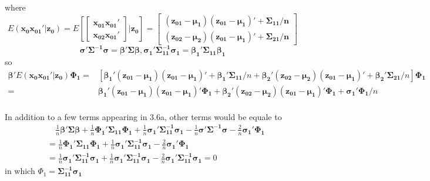 \documentclass[11pt]{article}
\begin{document}
where $$E(\boldsymbol{x_0x_{01}'}|\boldsymbol{z_0})=E\left[\begin{bmatrix}
\boldsymbol{x_{01}x_{01}'}\\
\boldsymbol{x_{02}x_{01}'}
\end{bmatrix}|\boldsymbol{z_0}\right]=\begin{bmatrix}\boldsymbol{
(z_{01}-\mu_1)(z_{01}-\mu_1)'+\Sigma_{11}/n}\\
\boldsymbol{(z_{02}-\mu_2)(z_{01}-\mu_1)'+\Sigma_{21}/n}
\end{bmatrix}$$
$$\boldsymbol{\sigma'\Sigma^{-1}\sigma=\beta'\Sigma\beta}, \boldsymbol{\sigma_1'\Sigma_{11}^{-1}\sigma_1=\beta_1'\Sigma_{11}\beta_1}$$
so 
$$\begin{aligned}
\boldsymbol{\beta'}E(\boldsymbol{x_0x_{01}'}|\boldsymbol{z_0})\boldsymbol{\Phi_1}
=&[\boldsymbol{\beta_1'(z_{01}-\mu_1)(z_{01}-\mu_1)'+\beta_1'\Sigma_{11}}/n+\boldsymbol{\beta_2'(z_{02}-\mu_2)(z_{01}-\mu_1)'+\beta_2'\Sigma_{21}}/n]\boldsymbol{\Phi_1}\\
=&\boldsymbol{\beta_1'(z_{01}-\mu_1)(z_{01}-\mu_1)'\Phi_1}+\boldsymbol{\beta_2'(z_{02}-\mu_2)(z_{01}-\mu_1)'\Phi_1}+\boldsymbol{\sigma_1'\Phi_1}/n\\
\end{aligned}$$

In addition to a few terms appearing in 3.6a, other terms would be equale to
$$\begin{aligned}
&\quad\frac{1}{n}\boldsymbol{\beta'\Sigma\beta}+\frac{1}{n}\boldsymbol{\Phi_1'\Sigma_{11}\Phi_1}+\frac{1}{n}\boldsymbol{\sigma_1'\Sigma_{11}^{-1}\sigma_1}-\frac{1}{n}\boldsymbol{\sigma'\Sigma^{-1}\sigma}-\frac{2}{n}\boldsymbol{\sigma_1'\Phi_1}\\
&=\frac{1}{n}\boldsymbol{\Phi_1'\Sigma_{11}\Phi_1}+\frac{1}{n}\boldsymbol{\sigma_1'\Sigma_{11}^{-1}\sigma_1}-\frac{2}{n}\boldsymbol{\sigma_1'\Phi_1}\\
&=\frac{1}{n}\boldsymbol{\sigma_1'\Sigma_{11}^{-1}\sigma_1}+\frac{1}{n}\boldsymbol{\sigma_1'\Sigma_{11}^{-1}\sigma_1}-\frac{2}{n}\boldsymbol{\sigma_1'\Sigma_{11}^{-1}\sigma_1}=0
\end{aligned}$$
in which $\Phi_1 = \boldsymbol{\Sigma_{11}^{-1}\sigma_1}$
\end{document}
